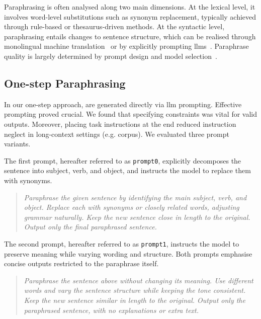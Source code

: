 Paraphrasing is often analysed along two main dimensions. 
At the lexical level, it involves word-level substitutions such as synonym replacement, typically achieved through rule-based or thesaurus-driven methods. 
At the syntactic level, paraphrasing entails changes to sentence structure, which can be realised through monolingual machine translation~\citep{zhou_paraphrase_2021} or by explicitly prompting \acp{llm}~\citep{kurt_pehlivanoglu_comparative_2024}.
Paraphrase quality is largely determined by prompt design and model selection~\citep{Wu_ODD_challenges_2025}.


\subsection{One-step Paraphrasing}
\label{subsec:one_step_paraphrasing_prompts}

In our one-step approach, \imps{} are generated directly via \ac{llm} prompting. 
Effective prompting proved crucial. 
We found that specifying constraints was vital for valid outputs. 
Moreover, placing task instructions at the end reduced instruction neglect in long-context settings (e.g. \dataGutenberg{} corpus). 
We evaluated three prompt variants.

The first prompt, hereafter referred to as \texttt{prompt0}, explicitly decomposes the sentence into subject, verb, and object, and instructs the model to replace them with synonyms.
\begin{quote}
    \textit{Paraphrase the given sentence by identifying the main subject, verb, and object. Replace each with synonyms or closely related words, adjusting grammar naturally. Keep the new sentence close in length to the original. Output only the final paraphrased sentence.}
\end{quote}

The second prompt, hereafter referred to as \texttt{prompt1}, instructs the model to preserve meaning while varying wording and structure. 
Both prompts emphasise concise outputs restricted to the paraphrase itself.
\begin{quote}
    \textit{Paraphrase the sentence above without changing its meaning. Use different words and vary the sentence structure while keeping the tone consistent. Keep the new sentence similar in length to the original. Output only the paraphrased sentence, with no explanations or extra text.}
\end{quote}

